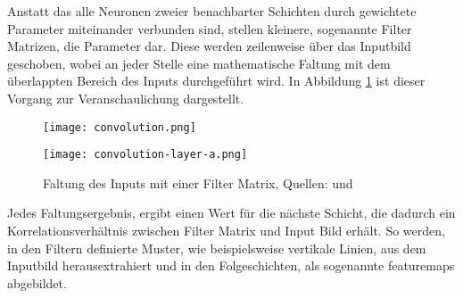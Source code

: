 Anstatt das alle Neuronen zweier benachbarter Schichten 
durch gewichtete Parameter miteinander verbunden sind, 
stellen kleinere, sogenannte Filter Matrizen, die 
Parameter dar.
Diese werden zeilenweise über das Inputbild 
geschoben, wobei an jeder Stelle eine mathematische 
Faltung mit dem überlappten Bereich des Inputs 
durchgeführt wird. In Abbildung \ref{fig:faltung}
ist dieser Vorgang zur Veranschaulichung dargestellt.
\vspace{1cm}

\begin{figure}[H]
    \centering
    \begin{minipage}{0.49\textwidth}
        \centering
        \texttt{[image: convolution.png]}
    \end{minipage}
    \begin{minipage}{0.49\textwidth}
        \centering
        \texttt{[image: convolution-layer-a.png]}
    \end{minipage}  
    \caption{Faltung des Inputs mit einer Filter Matrix,
    Quellen: \cite{researcherSimpleIntroductionConvolutional2019}
    und \cite{amidiSuperVIPCheatsheet2019}}
    \label{fig:faltung}
\end{figure}
\vspace{1cm}

Jedes Faltungsergebnis, ergibt einen Wert für 
die nächste Schicht, die dadurch 
ein Korrelationsverhältnis zwischen
Filter Matrix und Input Bild erhält.
So werden, in den Filtern definierte Muster, wie 
beispielsweise vertikale Linien, 
aus dem Inputbild herausextrahiert und in 
den Folgeschichten, als sogenannte \Glspl{featuremap}
abgebildet.
\vspace{1cm}

